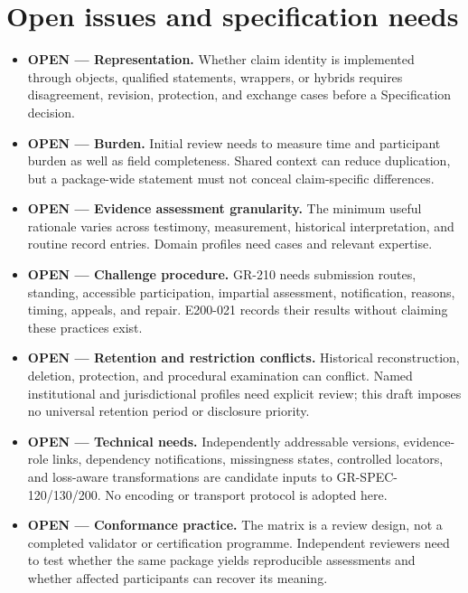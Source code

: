 \documentclass[11pt,a4paper]{article}
\begin{document}
\section{Open issues and specification needs}
\begin{itemize}
\item \textbf{OPEN --- Representation.} Whether claim identity is implemented through objects, qualified statements, wrappers, or hybrids requires disagreement, revision, protection, and exchange cases before a Specification decision.
\item \textbf{OPEN --- Burden.} Initial review needs to measure time and participant burden as well as field completeness. Shared context can reduce duplication, but a package-wide statement must not conceal claim-specific differences.
\item \textbf{OPEN --- Evidence assessment granularity.} The minimum useful rationale varies across testimony, measurement, historical interpretation, and routine record entries. Domain profiles need cases and relevant expertise.
\item \textbf{OPEN --- Challenge procedure.} GR-210 needs submission routes, standing, accessible participation, impartial assessment, notification, reasons, timing, appeals, and repair. E200-021 records their results without claiming these practices exist.
\item \textbf{OPEN --- Retention and restriction conflicts.} Historical reconstruction, deletion, protection, and procedural examination can conflict. Named institutional and jurisdictional profiles need explicit review; this draft imposes no universal retention period or disclosure priority.
\item \textbf{OPEN --- Technical needs.} Independently addressable versions, evidence-role links, dependency notifications, missingness states, controlled locators, and loss-aware transformations are candidate inputs to GR-SPEC-120/130/200. No encoding or transport protocol is adopted here.
\item \textbf{OPEN --- Conformance practice.} The matrix is a review design, not a completed validator or certification programme. Independent reviewers need to test whether the same package yields reproducible assessments and whether affected participants can recover its meaning.
\end{itemize}
\end{document}
